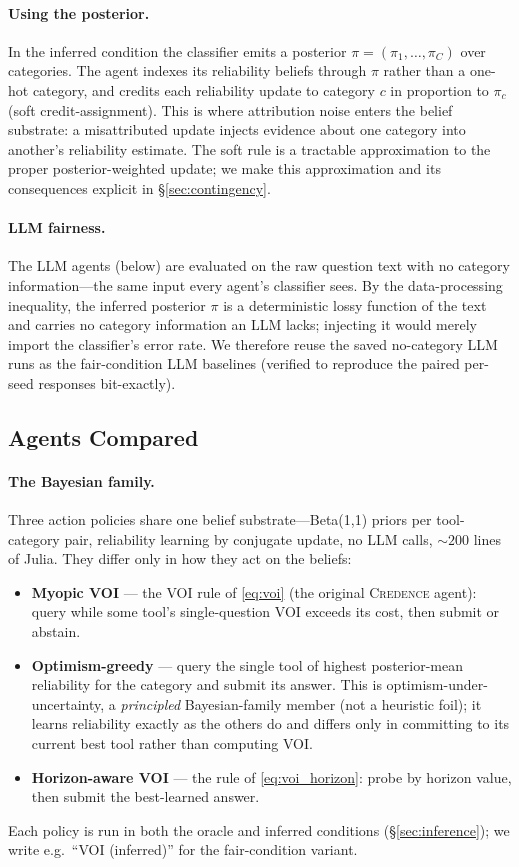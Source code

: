 \documentclass[11pt]{article}
\newcommand{\credence}{\textsc{Credence}}
\begin{document}
\paragraph{Using the posterior.} In the inferred condition the classifier emits a posterior $\pi = (\pi_1, \ldots, \pi_C)$ over categories. The agent indexes its reliability beliefs through $\pi$ rather than a one-hot category, and credits each reliability update to category $c$ in proportion to $\pi_c$ (soft credit-assignment). This is where attribution noise enters the belief substrate: a misattributed update injects evidence about one category into another's reliability estimate. The soft rule is a tractable approximation to the proper posterior-weighted update; we make this approximation and its consequences explicit in \S\ref{sec:contingency}.

\paragraph{LLM fairness.} The LLM agents (below) are evaluated on the raw question text with no category information---the same input every agent's classifier sees. By the data-processing inequality, the inferred posterior $\pi$ is a deterministic lossy function of the text and carries no category information an LLM lacks; injecting it would merely import the classifier's error rate. We therefore reuse the saved no-category LLM runs as the fair-condition LLM baselines (verified to reproduce the paired per-seed responses bit-exactly).

\subsection{Agents Compared}

\paragraph{The Bayesian family.} Three action policies share one belief substrate---Beta(1,1) priors per tool-category pair, reliability learning by conjugate update, no LLM calls, ${\sim}200$ lines of Julia. They differ only in how they act on the beliefs:
\begin{itemize}
\item \textbf{Myopic VOI} --- the VOI rule of \cref{eq:voi} (the original \credence{} agent): query while some tool's single-question VOI exceeds its cost, then submit or abstain.
\item \textbf{Optimism-greedy} --- query the single tool of highest posterior-mean reliability for the category and submit its answer. This is optimism-under-uncertainty, a \emph{principled} Bayesian-family member (not a heuristic foil); it learns reliability exactly as the others do and differs only in committing to its current best tool rather than computing VOI.
\item \textbf{Horizon-aware VOI} --- the rule of \cref{eq:voi_horizon}: probe by horizon value, then submit the best-learned answer.
\end{itemize}
Each policy is run in both the oracle and inferred conditions (\S\ref{sec:inference}); we write e.g.\ ``VOI (inferred)'' for the fair-condition variant.
\end{document}
